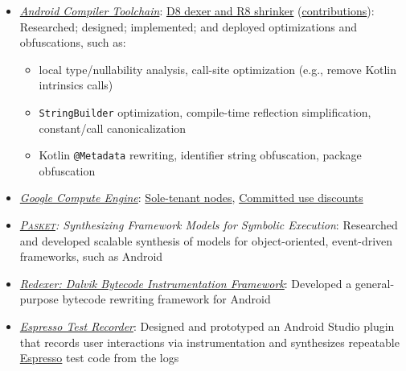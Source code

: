 \documentclass[9pt,letter,ragged2e,withhyper]{altacv}
\begin{document}
\begin{paracol}{2}
\divider

\begin{itemize}
\item\emph{\href{https://developer.android.com/studio/preview/index.html}{Android Compiler Toolchain}}:
\href{https://r8.googlesource.com/r8}{D8 dexer and R8 shrinker} (\href{https://r8-review.googlesource.com/q/author:jsjeon+status:merged}{\underline{contributions}}):
Researched; designed; implemented; and deployed optimizations and obfuscations, such as:
\begin{itemize}
\item local type/nullability analysis, call-site optimization (e.g., remove Kotlin intrinsics calls)
\item \texttt{StringBuilder} optimization, compile-time reflection simplification, constant/call canonicalization
\item Kotlin \texttt{@Metadata} rewriting, identifier string obfuscation, package obfuscation
\end{itemize}
\item\emph{\href{https://cloud.google.com/compute/}{Google Compute Engine}}:
\href{https://cloudplatform.googleblog.com/2018/06/Introducing-sole-tenant-nodes-for-Google-Compute-Engine.html}{Sole-tenant nodes},
\href{https://cloudplatform.googleblog.com/2017/09/committed-use-discounts-for-Google-Compute-Engine-now-generally-available.html}{Committed use discounts}
\end{itemize}

\divider


\begin{itemize}
\item\emph{\href{https://github.com/plum-umd/pasket}{\textsc{Pasket}}: Synthesizing Framework Models for Symbolic Execution}:
Researched and developed scalable synthesis of models for object-oriented, event-driven frameworks, such as Android
\item\emph{\href{https://github.com/plum-umd/redexer}{Redexer: Dalvik Bytecode Instrumentation Framework}}:
Developed a general-purpose bytecode rewriting framework for Android
\end{itemize}

\divider

\begin{itemize}
\item\emph{\href{https://developer.android.com/studio/test/espresso-test-recorder.html}{Espresso Test Recorder}}:
Designed and prototyped an Android Studio plugin that records user interactions
via instrumentation and synthesizes repeatable
\href{https://developer.android.com/training/testing/ui-testing/espresso-testing.html}{Espresso}
test code from the logs
\end{itemize}



\end{paracol}
\end{document}
